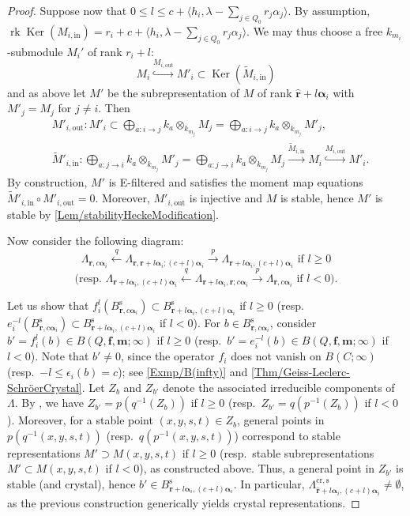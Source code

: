 \documentclass[a4paper,12pt]{article}
\theoremstyle{definition}
\theoremstyle{plain}
\theoremstyle{remark}
\DeclareMathOperator{\Ker}{Ker}
\DeclareMathOperator{\rk}{rk}
\newcommand{\st}{\mathrm{s}}
\newcommand\bfalpha{\bm{\alpha}}
\newcommand\bff{\mathbf{f}}
\newcommand\bfm{\mathbf{m}}
\newcommand\bfr{\mathbf{r}}
\begin{document}
\begin{proof}
Suppose now that $0\leq l\leq c+\langle h_i,\lambda-\sum_{j\in Q_0}r_j\alpha_j\rangle$. By assumption, $\rk\Ker(M_{i,\mathrm{in}})=r_i+c+\langle h_i,\lambda-\sum_{j\in Q_0}r_j\alpha_j\rangle$. We may thus choose a free $k_{m_i}$-submodule $M_i'$ of rank $r_i+l$:
\[
M_i\overset{M_{i,\mathrm{out}}}{\hookrightarrow}M'_i\subset\Ker(\widetilde{M}_{i,\mathrm{in}})
\]
and as above let $M'$ be the subrepresentation of $M$ of rank $\widehat{\bfr}+l\bfalpha_i$ with $M'_j = M_j$ for $j \neq i$. Then
\begin{align*}
& M'_{i,\mathrm{out}}\colon M'_i\subset\bigoplus_{a:i\rightarrow j}k_a\otimes_{k_{m_j}}M_j=\bigoplus_{a:i\rightarrow j}k_a\otimes_{k_{m_j}}M'_j, \\
& \widetilde{M}'_{i,\mathrm{in}}\colon\bigoplus_{a:j\rightarrow i}k_a\otimes_{k_{m_j}}M'_j=\bigoplus_{a:j\rightarrow i}k_a\otimes_{k_{m_j}}M_j\overset{\widetilde{M}_{i,\mathrm{in}}}{\rightarrow}M_i\overset{M_{i,\mathrm{out}}}{\hookrightarrow}M'_i .
\end{align*}
By construction, $M'$ is E-filtered and satisfies the moment map equations $\widetilde{M}'_{i,\mathrm{in}}\circ M'_{i,\mathrm{out}}=0$. Moreover, $M'_{i,\mathrm{out}}$ is injective and $M$ is stable, hence $M'$ is stable by \cref{Lem/stabilityHeckeModification}.

Now consider the following diagram:
\[
\Lambda_{\bfr,c\bfalpha_i}\overset{q}{\longleftarrow}\Lambda_{\bfr,\bfr+l\bfalpha_i;(c+l)\bfalpha_i}\overset{p}{\longrightarrow}\Lambda_{\bfr+l\bfalpha_i,(c+l)\bfalpha_i}
\text{ if }l\geq0
\]
\[
\text{(resp.\ }
\Lambda_{\bfr+l\bfalpha_i,(c+l)\bfalpha_i}\overset{q}{\longleftarrow}\Lambda_{\bfr+l\bfalpha_i,\bfr;c\bfalpha_i}\overset{p}{\longrightarrow}\Lambda_{\bfr,c\bfalpha_i}
\text{ if }l<0\text{).}
\]

Let us show that $f_i^l(B_{\bfr,c\bfalpha_i}^\st)\subset B_{\bfr+l\bfalpha_i,(c+l)\bfalpha_i}^\st$ if $l\geq0$ (resp.\ $e_i^{-l}(B_{\bfr,c\bfalpha_i}^\st)\subset B_{\bfr+l\bfalpha_i,(c+l)\bfalpha_i}^\st$ if $l<0$). 
For $b\in B_{\bfr,c\bfalpha_i}^\st$, consider $b'=f_i^l(b)\in B(Q,\bff,\bfm;\infty)$ if $l\geq0$ (resp.\ $b'=e_i^{-l}(b)\in B(Q,\bff,\bfm;\infty)$ if $l<0$). Note that $b'\ne0$, since the operator $f_i$ does not vanish on $B(C;\infty)$ (resp.\ $-l\leq\epsilon_i(b)=c$); see \cref{Exmp/B(infty)} and \cref{Thm/Geiss-Leclerc-SchröerCrystal}. Let $Z_b$ and $Z_{b'}$ denote the associated irreducible components of $\Lambda$. By \cite[Lem.\ 3.9]{GLS18a}, we have $Z_{b'}=p(q^{-1}(Z_b))$ if $l\geq0$ (resp.\ $Z_{b'}=q(p^{-1}(Z_b))$ if $l<0$). Moreover, for a stable point $(x,y,s,t)\in Z_b$, general points in $p(q^{-1}(x,y,s,t))$ (resp.\ $q(p^{-1}(x,y,s,t))$) correspond to stable representations $M'\supset M(x,y,s,t)$ if $l\geq0$ (resp.\ stable subrepresentations $M'\subset M(x,y,s,t)$ if $l<0$), as constructed above. Thus, a general point in $Z_{b'}$ is stable (and crystal), hence $b'\in B_{\bfr+l\bfalpha_i,(c+l)\bfalpha_i}^\st$. In particular, $\Lambda_{\widehat{\bfr}+l\bfalpha_i,(c+l)\bfalpha_i}^{\mathrm{cr},\st}\ne\emptyset$, as the previous construction generically yields crystal representations.


\end{proof}
\end{document}
